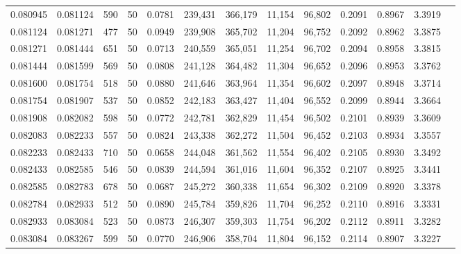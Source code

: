 \begin{tabular}{rrrrrrrrrrrrr}
0.080945 & 0.081124 &   590 &  50 &                                     0.0781 & 239,431 & 366,179 &  11,154 &  96,802 & 0.2091 & 0.8967 & 3.3919 \\
0.081124 & 0.081271 &   477 &  50 &                                     0.0949 & 239,908 & 365,702 &  11,204 &  96,752 & 0.2092 & 0.8962 & 3.3875 \\
0.081271 & 0.081444 &   651 &  50 &                                     0.0713 & 240,559 & 365,051 &  11,254 &  96,702 & 0.2094 & 0.8958 & 3.3815 \\
0.081444 & 0.081599 &   569 &  50 &                                     0.0808 & 241,128 & 364,482 &  11,304 &  96,652 & 0.2096 & 0.8953 & 3.3762 \\
0.081600 & 0.081754 &   518 &  50 &                                     0.0880 & 241,646 & 363,964 &  11,354 &  96,602 & 0.2097 & 0.8948 & 3.3714 \\
0.081754 & 0.081907 &   537 &  50 &                                     0.0852 & 242,183 & 363,427 &  11,404 &  96,552 & 0.2099 & 0.8944 & 3.3664 \\
0.081908 & 0.082082 &   598 &  50 &                                     0.0772 & 242,781 & 362,829 &  11,454 &  96,502 & 0.2101 & 0.8939 & 3.3609 \\
0.082083 & 0.082233 &   557 &  50 &                                     0.0824 & 243,338 & 362,272 &  11,504 &  96,452 & 0.2103 & 0.8934 & 3.3557 \\
0.082233 & 0.082433 &   710 &  50 &                                     0.0658 & 244,048 & 361,562 &  11,554 &  96,402 & 0.2105 & 0.8930 & 3.3492 \\
0.082433 & 0.082585 &   546 &  50 &                                     0.0839 & 244,594 & 361,016 &  11,604 &  96,352 & 0.2107 & 0.8925 & 3.3441 \\
0.082585 & 0.082783 &   678 &  50 &                                     0.0687 & 245,272 & 360,338 &  11,654 &  96,302 & 0.2109 & 0.8920 & 3.3378 \\
0.082784 & 0.082933 &   512 &  50 &                                     0.0890 & 245,784 & 359,826 &  11,704 &  96,252 & 0.2110 & 0.8916 & 3.3331 \\
0.082933 & 0.083084 &   523 &  50 &                                     0.0873 & 246,307 & 359,303 &  11,754 &  96,202 & 0.2112 & 0.8911 & 3.3282 \\
0.083084 & 0.083267 &   599 &  50 &                                     0.0770 & 246,906 & 358,704 &  11,804 &  96,152 & 0.2114 & 0.8907 & 3.3227 \\

\end{tabular}

